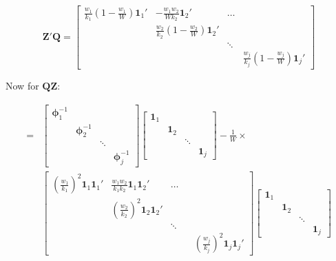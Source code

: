 \begin{equation}
  \mathbf{Z}'\mathbf{Q}  = \begin{bmatrix}
        \frac{w_1}{k_1}(1 - \frac{w_1}{W})\mathbf{1}_1' & -\frac{w_1w_2}{Wk_2}\mathbf{1}_2' &  \dots  \\
         &  \frac{w_2}{k_2}(1 - \frac{w_2}{W})\mathbf{1}_2' & &  \\
         & & \ddots &  \\
         & & & \frac{w_j}{k_j}(1 - \frac{w_j}{W})\mathbf{1}_j'
    \end{bmatrix} 
    \nonumber
\end{equation}

Now for $\mathbf{Q}\mathbf{Z}$:

\begin{equation}
  \begin{split}
      = & \begin{bmatrix}
        \mathbf{\phi}_1^{-1} &  & &\\
         & \mathbf{\phi}_2^{-1} &  &\\
         & & \ddots &  \\
         & & &   \mathbf{\phi}_j^{-1}
    \end{bmatrix}\begin{bmatrix}
        \mathbf{1}_1 & & &  \\
         & \mathbf{1}_2 & &  \\
         & & \ddots &  \\
         & & &  \mathbf{1}_j
    \end{bmatrix} -  \frac{1}{W} \times \\ 
    & \begin{bmatrix}
        (\frac{w_1}{k_1})^2\mathbf{1}_1\mathbf{1}_1' & \frac{w_1w_2}{k_1k_2}\mathbf{1}_1\mathbf{1}_2' &  \dots & &  \\
         &  (\frac{w_2}{k_2})^2\mathbf{1}_2\mathbf{1}_2' & & &   \\
         & & \ddots & &  \\
         & & & &  (\frac{w_j}{k_j})^2\mathbf{1}_j\mathbf{1}_j'
    \end{bmatrix} \begin{bmatrix}
        \mathbf{1}_1 & & &  \\
         & \mathbf{1}_2 & &  \\
         & & \ddots &  \\
         & & &  \mathbf{1}_j
    \end{bmatrix}
  \end{split}
    \nonumber
\end{equation}

